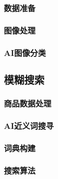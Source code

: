 \subsubsection{数据准备}

\subsubsection{图像处理}

\subsubsection{AI图像分类}

\subsection{模糊搜索}

\subsubsection{商品数据处理}

\subsubsection{AI近义词搜寻}

\subsubsection{词典构建}

\subsubsection{搜索算法}